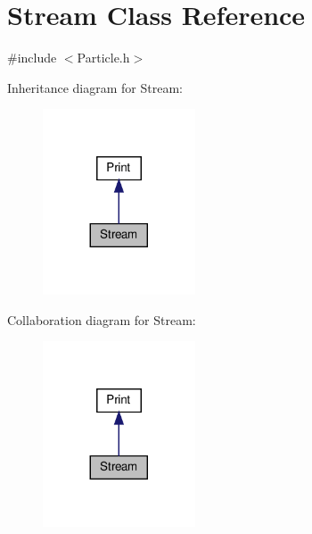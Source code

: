 \section{Stream Class Reference}
\label{class_stream}


{\ttfamily \#include $<$Particle.\+h$>$}



Inheritance diagram for Stream\+:\nopagebreak
\begin{figure}[H]
\begin{center}
\leavevmode
\includegraphics[width=128pt]{class_stream__inherit__graph}
\end{center}
\end{figure}


Collaboration diagram for Stream\+:\nopagebreak
\begin{figure}[H]
\begin{center}
\leavevmode
\includegraphics[width=128pt]{class_stream__coll__graph}
\end{center}
\end{figure}
